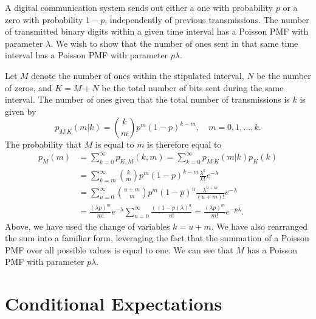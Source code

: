\begin{example}
A digital communication system sends out either a one with probability $p$ or a zero with probability $1 - p$, independently of previous transmissions.
The number of transmitted binary digits within a given time interval has a Poisson PMF with parameter $\lambda$.
We wish to show that the number of ones sent in that same time interval has a Poisson PMF with parameter $p \lambda$.

Let $M$ denote the number of ones within the stipulated interval, $N$ be the number of zeros, and $K = M + N$ be the total number of bits sent during the same interval.
The number of ones given that the total number of transmissions is $k$ is given by
\begin{equation*}
p_{M|K} (m | k) = \binom{k}{m} p^m (1-p)^{k - m},
\quad m = 0, 1, \ldots, k.
\end{equation*}
The probability that $M$ is equal to $m$ is therefore equal to
\begin{equation*}
\begin{split}
p_{M} (m) &= \sum_{k = 0}^{\infty} p_{K,M} (k, m)
= \sum_{k = 0}^{\infty} p_{M|K} (m | k) p_K(k) \\
&= \sum_{k = m}^{\infty} \binom{k}{m} p^m (1-p)^{k - m}
\frac{\lambda^{k}}{k !} e^{-\lambda} \\
&= \sum_{u = 0}^{\infty} \binom{u+m}{m} p^m (1-p)^{u}
\frac{\lambda^{u+m}}{(u+m)!} e^{-\lambda} \\
&= \frac{(\lambda p)^m}{m!} e^{-\lambda}
\sum_{u = 0}^{\infty} \frac{( (1-p) \lambda)^{u}}{u!}
= \frac{(\lambda p)^m}{m!} e^{-p \lambda} .
\end{split}
\end{equation*}
Above, we have used the change of variables $k = u+m$.
We have also rearranged the sum into a familiar form, leveraging the fact that the summation of a Poisson PMF over all possible values is equal to one.
We can see that $M$ has a Poisson PMF with parameter $p \lambda$.
\end{example}


\section{Conditional Expectations}

